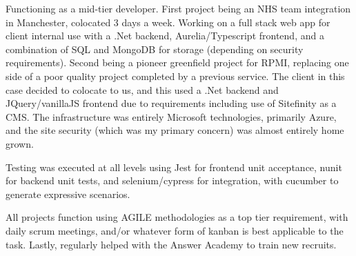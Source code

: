 \documentclass[a4paper]{cv}
\begin{document}
	\begin{minipage}[t]{0.8\textwidth}\centering
		
		\vspace{2em}
		
		\vspace{\topsep} %
		\begin{tightitemize}
			\item\small Functioning as a mid-tier developer. First project being an NHS team integration in Manchester, colocated 3 days a week. Working on a full stack web app for client internal use with a .Net backend, Aurelia/Typescript frontend, and a combination of SQL and MongoDB for storage (depending on security requirements). Second being a pioneer greenfield project for RPMI, replacing one side of a poor quality project completed by a previous service. The client in this case decided to colocate to us, and this used a .Net backend and JQuery/vanillaJS frontend due to requirements including use of Sitefinity as a CMS. The infrastructure was entirely Microsoft technologies, primarily Azure, and the site security (which was my primary concern) was almost entirely home grown.
			\item\small Testing was executed at all levels using Jest for frontend unit acceptance, nunit for backend unit tests, and selenium/cypress for integration, with cucumber to generate expressive scenarios.
			\item\small All projects function using AGILE methodologies as a top tier requirement, with daily scrum meetings, and/or whatever form of kanban is best applicable to the task. Lastly, regularly helped with the Answer Academy to train new recruits.
		\end{tightitemize}
		
		\sectionspace %
		
		\vspace{2em}
		

\end{minipage}
\end{document}

